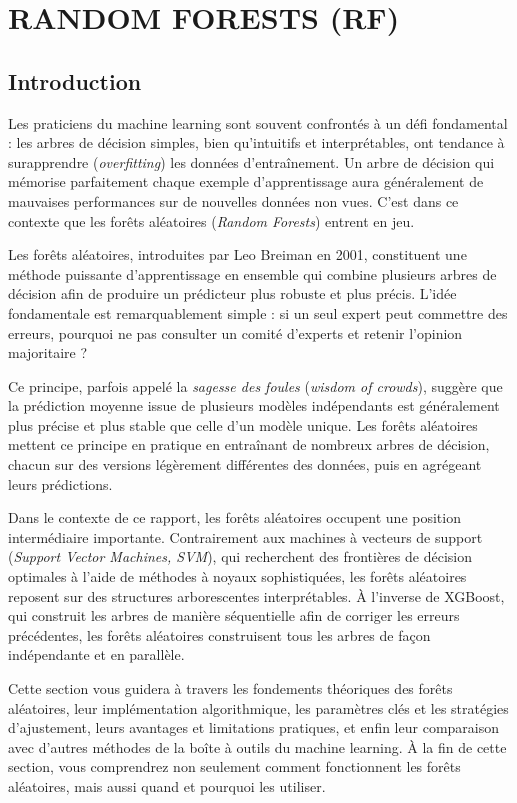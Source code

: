 \chapter{RANDOM FORESTS (RF)}
\section{Introduction}

Les praticiens du machine learning sont souvent confrontés à un défi fondamental : les arbres de décision simples, bien qu’intuitifs et interprétables, ont tendance à surapprendre (\emph{overfitting}) les données d’entraînement. Un arbre de décision qui mémorise parfaitement chaque exemple d’apprentissage aura généralement de mauvaises performances sur de nouvelles données non vues. C’est dans ce contexte que les forêts aléatoires (\emph{Random Forests}) entrent en jeu.

Les forêts aléatoires, introduites par Leo Breiman en 2001, constituent une méthode puissante d’apprentissage en ensemble qui combine plusieurs arbres de décision afin de produire un prédicteur plus robuste et plus précis. L’idée fondamentale est remarquablement simple : si un seul expert peut commettre des erreurs, pourquoi ne pas consulter un comité d’experts et retenir l’opinion majoritaire ?

Ce principe, parfois appelé la \emph{sagesse des foules} (\emph{wisdom of crowds}), suggère que la prédiction moyenne issue de plusieurs modèles indépendants est généralement plus précise et plus stable que celle d’un modèle unique. Les forêts aléatoires mettent ce principe en pratique en entraînant de nombreux arbres de décision, chacun sur des versions légèrement différentes des données, puis en agrégeant leurs prédictions.

Dans le contexte de ce rapport, les forêts aléatoires occupent une position intermédiaire importante. Contrairement aux machines à vecteurs de support (\emph{Support Vector Machines, SVM}), qui recherchent des frontières de décision optimales à l’aide de méthodes à noyaux sophistiquées, les forêts aléatoires reposent sur des structures arborescentes interprétables. À l’inverse de XGBoost, qui construit les arbres de manière séquentielle afin de corriger les erreurs précédentes, les forêts aléatoires construisent tous les arbres de façon indépendante et en parallèle.

Cette section vous guidera à travers les fondements théoriques des forêts aléatoires, leur implémentation algorithmique, les paramètres clés et les stratégies d’ajustement, leurs avantages et limitations pratiques, et enfin leur comparaison avec d’autres méthodes de la boîte à outils du machine learning. À la fin de cette section, vous comprendrez non seulement comment fonctionnent les forêts aléatoires, mais aussi quand et pourquoi les utiliser.
